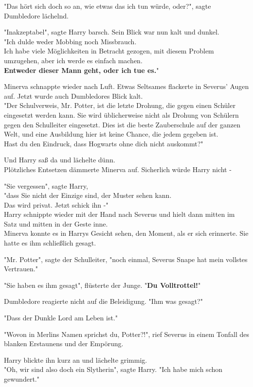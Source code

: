 {"Das hört sich doch so an, wie etwas das ich tun würde, oder?", sagte Dumbledore lächelnd.

"Inakzeptabel", sagte Harry barsch. Sein Blick war nun kalt und dunkel.\\ "Ich dulde weder Mobbing noch Missbrauch.\\ Ich habe viele Möglichkeiten in Betracht gezogen, mit diesem Problem umzugehen, aber ich werde es einfach machen.\\ \textbf{Entweder dieser Mann geht, oder ich tue es.}"

Minerva schnappte wieder nach Luft. Etwas Seltsames flackerte in Severus' Augen auf. Jetzt wurde auch Dumbledores Blick kalt.\\ "Der Schulverweis, Mr. Potter, ist die letzte Drohung, die gegen einen Schüler eingesetzt werden kann. Sie wird üblicherweise nicht als Drohung von Schülern gegen den Schulleiter eingesetzt. Dies ist die beste Zauberschule auf der ganzen Welt, und eine Ausbildung hier ist keine Chance, die jedem gegeben ist.\\ Hast du den Eindruck, dass Hogwarts ohne dich nicht auskommt?"

Und Harry saß da und lächelte dünn.\\ Plötzliches Entsetzen dämmerte Minerva auf. Sicherlich würde Harry nicht -

"Sie vergessen", sagte Harry,\\ "dass Sie nicht der Einzige sind, der Muster sehen kann.\\ Das wird privat. Jetzt schick ihn -"\\ Harry schnippte wieder mit der Hand nach Severus und hielt dann mitten im Satz und mitten in der Geste inne.\\ Minerva konnte es in Harrys Gesicht sehen, den Moment, als er sich erinnerte. Sie hatte es ihm schließlich gesagt.

"Mr. Potter", sagte der Schulleiter, "noch einmal, Severus Snape hat mein vollstes Vertrauen."

"Sie haben es ihm gesagt", flüsterte der Junge. "\textbf{Du Volltrottel!}"

Dumbledore reagierte nicht auf die Beleidigung. "Ihm was gesagt?"

"Dass der Dunkle Lord am Leben ist."

"Wovon in Merlins Namen sprichst du, Potter?!", rief Severus in einem Tonfall des blanken Erstaunens und der Empörung.

Harry blickte ihn kurz an und lächelte grimmig.\\ "Oh, wir sind also doch ein Slytherin", sagte Harry. "Ich habe mich schon gewundert."

}
